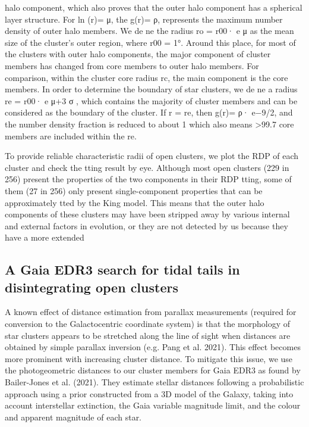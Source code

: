 \documentclass[../main.tex]{subfiles}
\begin{document}
{halo component, which also proves that the outer halo
component has a spherical layer structure.
For ln (r)= μ, the g(r)= ρ, represents the maximum number
density of outer halo members. We de ne the radius
ro
= r00· e μ as the mean size of the cluster’s outer region,
where r00 = 1°. Around this place, for most of the clusters with
outer halo components, the major component of cluster
members has changed from core members to outer halo
members. For comparison, within the cluster core radius rc, the
main component is the core members. In order to determine the
boundary of star clusters, we de ne a radius re
= r00· e μ+3 σ
,
which contains the majority of cluster members and can be
considered as the boundary of the cluster. If r = re, then
g(r)= ρ· e−9/2, and the number density fraction is reduced to
about 1%
which also means >99.7%
core members are included within the re.

To provide reliable characteristic radii of open clusters, we
plot the RDP of each cluster and check the tting result by eye.
Although most open clusters (229 in 256) present the properties
of the two components in their RDP tting, some of them (27
in 256) only present single-component properties that can be
approximately tted by the King model. This means that the
outer halo components of these clusters may have been stripped
away by various internal and external factors in evolution, or
they are not detected by us because they have a more extended

\subsection{A Gaia EDR3 search for tidal tails in disintegrating open clusters}



A known effect of distance estimation from parallax measurements
(required for conversion to the Galactocentric coordinate system) is
that the morphology of star clusters appears to be stretched along
the line of sight when distances are obtained by simple parallax
inversion (e.g. Pang et al. 2021). This effect becomes more prominent
with increasing cluster distance. To mitigate this issue, we use the
photogeometric distances to our cluster members for Gaia EDR3 as
found by Bailer-Jones et al. (2021). They estimate stellar distances
following a probabilistic approach using a prior constructed from a
3D model of the Galaxy, taking into account interstellar extinction,
the Gaia variable magnitude limit, and the colour and apparent
magnitude of each star.

}
\end{document}
